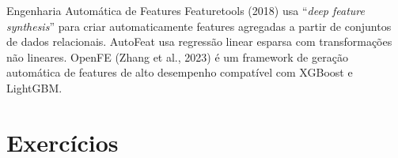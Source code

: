 \documentclass[12pt,a4paper]{article}
\begin{document}
\begin{estadoartebox}{Engenharia Automática de Features}
Featuretools (2018) usa ``\textit{deep feature synthesis}'' para criar automaticamente features agregadas a partir de conjuntos de dados relacionais. AutoFeat usa regressão linear esparsa com transformações não lineares. OpenFE (Zhang et al., 2023) é um framework de geração automática de features de alto desempenho compatível com XGBoost e LightGBM.
\end{estadoartebox}

\section{Exercícios}
\end{document}
